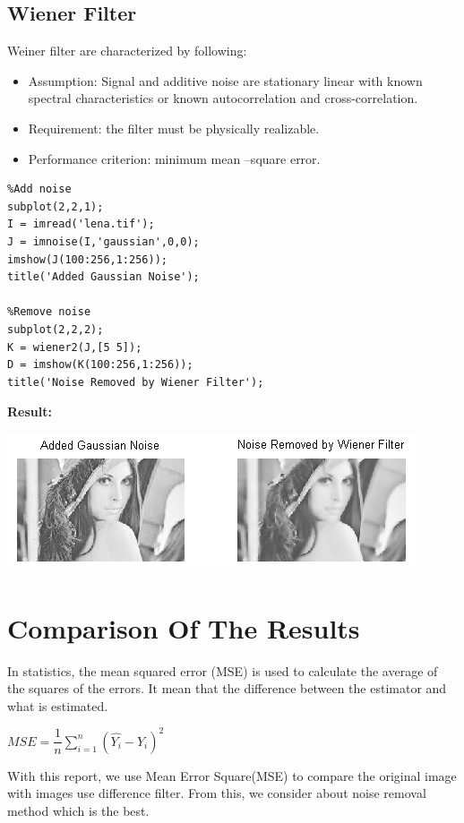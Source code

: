 \documentclass[10pt]{article}
\begin{document}
\subsection{Wiener Filter}

Weiner filter are characterized by following:
\begin{itemize}
	\item Assumption: Signal and additive noise are stationary linear with known spectral characteristics or known autocorrelation and cross-correlation.
	\item Requirement: the filter must be physically realizable.
	\item Performance criterion: minimum mean –square error. 
\end{itemize} 

\begin{lstlisting}
%Add noise
subplot(2,2,1);
I = imread('lena.tif');
J = imnoise(I,'gaussian',0,0);
imshow(J(100:256,1:256));
title('Added Gaussian Noise');

%Remove noise
subplot(2,2,2);
K = wiener2(J,[5 5]);
D = imshow(K(100:256,1:256));
title('Noise Removed by Wiener Filter');
\end{lstlisting} 

\textbf{Result:}

\includegraphics{Wiener.png}

\section{ Comparison Of The Results }
In statistics, the mean squared error (MSE) is used to calculate the average of the squares of the errors. It mean that the difference between the estimator and what is estimated.
\begin{center}
$MSE =  \dfrac{1}{n} \displaystyle \sum_{i=1}^{n}(\hat{Y_i} - Y_i)^2$
	
\end{center}


With this report, we use Mean Error Square(MSE) to compare the original image with images use difference filter. From this, we consider about noise removal method which is the best.
\end{document}
